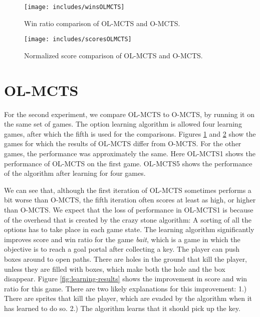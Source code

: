 \begin{figure}
	\centering
	\texttt{[image: includes/winsOLMCTS]}
	\vspace{-.8cm}
	\caption{Win ratio comparison of OL-MCTS and O-MCTS.}
	\label{fig:wins-olmcts}
\end{figure}

\begin{figure}
	\centering
	\texttt{[image: includes/scoresOLMCTS]}
	\vspace{-.8cm}
	\caption{Normalized score comparison of OL-MCTS and O-MCTS.}
	\label{fig:scores-olmcts}
\end{figure}

\section{OL-MCTS}
\label{subsec:olmcts}
For the second experiment, we compare OL-MCTS to O-MCTS, by running it on the
same set of games. The option learning algorithm is allowed four learning games,
after which the fifth is used for the comparisons. Figures \ref{fig:wins-olmcts}
and \ref{fig:scores-olmcts} show the games for which the results of OL-MCTS
differ from O-MCTS. For the other games, the performance was approximately the
same. Here OL-MCTS1 shows the performance of OL-MCTS on the first game. OL-MCTS5
shows the performance of the algorithm after learning for four games. 

We can see that, although the first iteration of OL-MCTS sometimes performs a
bit worse than O-MCTS, the fifth iteration often scores at least as high, or
higher than O-MCTS. We expect that the loss of performance in OL-MCTS1 is
because of the overhead that is created by the crazy stone algorithm: A sorting
of all the options has to take place in each game state. The learning algorithm
significantly improves score and win ratio for the game \textit{bait}, which is
a game in which the objective is to reach a goal portal after collecting a key.
The player can push boxes around to open paths. There are holes in the ground
that kill the player, unless they are filled with boxes, which make both the
hole and the box disappear. Figure \ref{fig:learning-results} shows the
improvement in score and win ratio for this game. There are two likely 
explanations for this improvement: 1.) There are sprites that kill the player,
which are evaded by the algorithm when it has learned to do so.  2.) The
algorithm learns that it should pick up the key.

